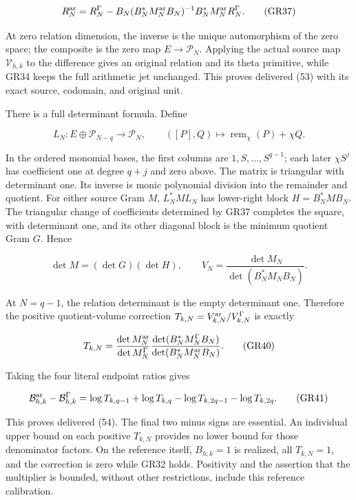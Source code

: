 \documentclass{article}
\begin{document}
\[
R_N^{\rm ar}
=R_N^\Gamma-
B_N(B_N^*M_N^{\rm ar}B_N)^{-1}B_N^*M_N^{\rm ar}R_N^\Gamma.
\tag{GR37}
\]

At zero relation dimension, the inverse is the unique automorphism of the zero space; the composite is the zero map \(E\to\mathcal P_N\). Applying the actual source map \(\mathcal V_{h,k}\) to the difference gives an original relation and its theta primitive, while GR34 keeps the full arithmetic jet unchanged. This proves delivered (53) with its exact source, codomain, and original unit.

There is a full determinant formula. Define

\[
L_N:E\oplus\mathcal P_{N-q}\longrightarrow\mathcal P_N,\qquad
([P],Q)\longmapsto\operatorname{rem}_\chi(P)+\chi Q.
\tag{GR38}
\]

In the ordered monomial bases, the first columns are \(1,S,\ldots,S^{q-1}\); each later \(\chi S^j\) has coefficient one at degree \(q+j\) and zero above. The matrix is triangular with determinant one. Its inverse is monic polynomial division into the remainder and quotient. For either source Gram \(M\), \(L_N^*ML_N\) has lower-right block \(H=B_N^*MB_N\). The triangular change of coefficients determined by GR37 completes the square, with determinant one, and its other diagonal block is the minimum quotient Gram \(G\). Hence

\[
\det M=(\det G)(\det H),\qquad
V_N=\frac{\det M_N}{\det(B_N^*M_NB_N)}.
\tag{GR39}
\]

At \(N=q-1\), the relation determinant is the empty determinant one. Therefore the positive quotient-volume correction \(T_{k,N}=V_{k,N}^{\rm ar}/V_{k,N}^\Gamma\) is exactly

\[
T_{k,N}=
\frac{\det M_N^{\rm ar}}{\det M_N^\Gamma}
\frac{\det(B_N^*M_N^\Gamma B_N)}
{\det(B_N^*M_N^{\rm ar}B_N)}.
\tag{GR40}
\]

Taking the four literal endpoint ratios gives

\[
\mathcal B_{h,k}^{\rm ar}-\mathcal B_{h,k}^\Gamma
=\log T_{k,q-1}+\log T_{k,q}
-\log T_{k,2q-1}-\log T_{k,2q}.
\tag{GR41}
\]

This proves delivered (54). The final two minus signs are essential. An individual upper bound on each positive \(T_{k,N}\) provides no lower bound for those denominator factors. On the reference itself, \(B_{h;k}=1\) is realized, all \(T_{k,N}=1\), and the correction is zero while GR32 holds. Positivity and the assertion that the multiplier is bounded, without other restrictions, include this reference calibration.
\end{document}
